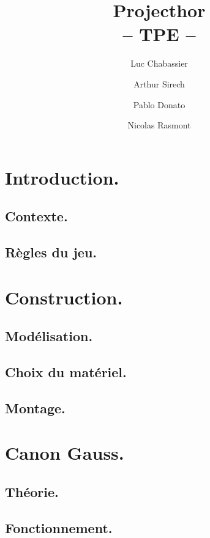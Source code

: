 \documentclass{report}
\title{Projecthor\\-- TPE --}
\author{Luc Chabassier \and Arthur Sirech \and Pablo Donato \and Nicolas Rasmont}
\begin{document}
\maketitle

\tableofcontents

\part{Introduction.}
\chapter{Contexte.} \label{intro}
% 

\chapter{Règles du jeu.} \label{regles}
% 

\part{Construction.}
\chapter{Modélisation.} \label{moter}
% 

\chapter{Choix du matériel.} \label{mater} %
% 
% 

\chapter{Montage.} \label{mont}
% 

\part{Canon Gauss.}
\chapter{Théorie.} \label{gauss}


\chapter{Fonctionnement.} \label{fonc}

\end{document}

